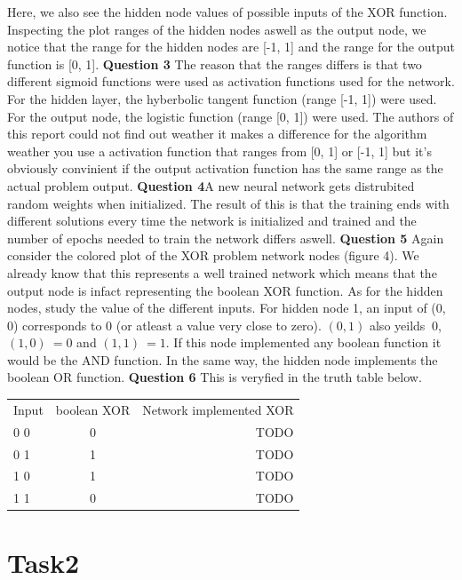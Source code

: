 \documentclass[a4paper]{article}
\begin{document}
Here, we also see the hidden node values of possible inputs of the XOR function.
Inspecting the plot ranges of the hidden nodes aswell as the output node, we notice that
the range for the hidden nodes are [-1, 1] and the range for the output function is [0, 1].
\textbf{Question 3} The reason that the ranges differs is that two 
different sigmoid functions were used as activation functions used for the network. 
For the hidden layer, the hyberbolic tangent function (range [-1, 1]) were used. 
For the output node, the logistic function (range [0, 1]) were used. The authors of 
this report could not find out weather it makes a difference for the algorithm weather 
you use a activation function that ranges from [0, 1] or [-1, 1] but it's obviously 
convinient if the output activation function has the same range as the actual problem 
output. \textbf{Question 4}A new neural network gets distrubited random weights 
when initialized. The result of this is that the training ends with different 
solutions every time the network is initialized and trained and the 
number of epochs needed to train the network differs aswell. 
\textbf{Question 5} Again consider the colored plot of the XOR problem 
network nodes (figure 4). We already 
know that this represents a well trained network which means that the output node is 
infact representing the boolean XOR function. As for the hidden nodes, study the value 
of the different inputs. For hidden node 1, an input of (0, 0) corresponds to 0 (or 
atleast a value very close to zero). $(0, 1)$ also yeilds $~ 0$, $(1, 0) ~= 0$ and 
$(1, 1) ~= 1$. If this node implemented any boolean function it would be the AND function.
In the same way, the hidden node implements the boolean OR function. 
\textbf{Question 6} This is veryfied in the truth table below. 

\begin{center}
    \begin{tabular} {l | c | r }
        Input & boolean XOR & Network implemented XOR \\
        0 0 & 0 & TODO \\
        0 1 & 1 & TODO \\
        1 0 & 1 & TODO \\
        1 1 & 0 & TODO \\
    \end{tabular}
\end{center}

\section{Task2}
\end{document}

